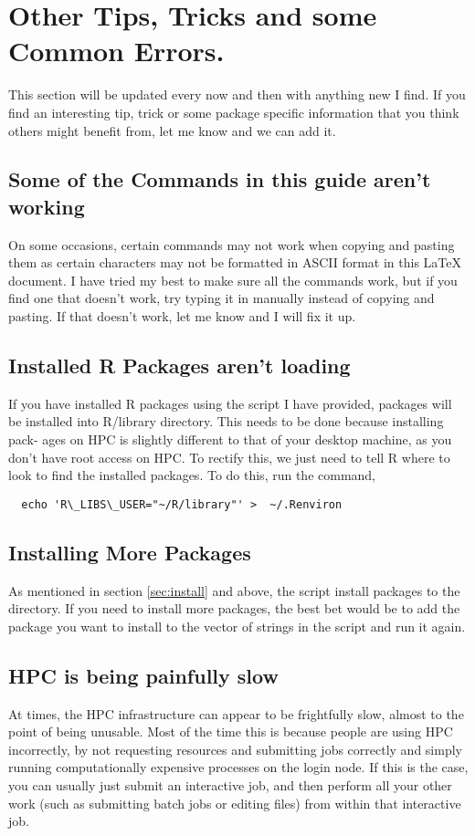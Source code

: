 \section{Other Tips, Tricks and some Common Errors.}
This section will be updated every now and then with anything new I find. If you find an interesting tip, trick or some package specific information that you think others might benefit from, let me know and we can add it.
%
%
\subsection{ Some of the Commands in this guide aren't working \frownie}
On some occasions, certain commands may not work when copying and pasting them as certain characters may not be formatted in ASCII format in this LaTeX document. I have tried my best to make sure all the commands work, but if you find one that doesn’t work, try typing it in manually instead of copying and pasting. If that doesn’t work, let me know and I will fix it up.
%
%
\subsection{Installed R Packages aren't loading}
%
%
If you have installed R packages using the script I have provided, packages will be installed into R/library directory. This needs to be done because installing pack- ages on HPC is slightly different to that of your desktop machine, as you don’t have root access on HPC. To rectify this, we just need to tell R where to look to find the installed packages. To do this, run the command,
%
\begin{verbatim}
  echo 'R\_LIBS\_USER="~/R/library"' >  ~/.Renviron
\end{verbatim}
%
%
%
\subsection{Installing More Packages}
%
%
As mentioned in section \ref{sec:install} and above, the  script install packages to the  directory. If you need to install more packages, the best bet would be to add the package you want to install to the vector of strings in the  script and run it again.
%
%
%
%
\subsection{HPC is being painfully slow \frownie}
%
%
At times, the HPC infrastructure can appear to be frightfully slow, almost to the point of being unusable. Most of the time this is because people are using HPC incorrectly, by not requesting resources and submitting jobs correctly and simply running computationally expensive processes on the login node. If this is the case, you can usually just submit an interactive job, and then perform all your other work (such as submitting batch jobs or editing files) from within that interactive job.
%
%
%
%
